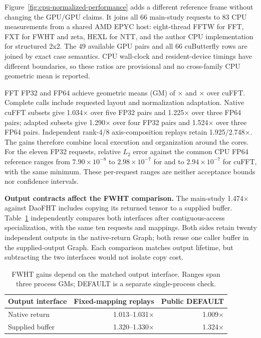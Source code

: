 Figure~\ref{fig:cpu-normalized-performance} adds a different reference frame
without changing the GPU/GPU claims. It joins all 66 main-study requests to 83
CPU measurements from a shared AMD EPYC host: eight-thread FFTW for FFT, FXT for
FWHT and zeta, HEXL for NTT, and the author CPU implementation for structured
2x2. The 49 available GPU pairs and all 66 cuButterfly rows are joined by exact
case semantics. CPU wall-clock and resident-device timings have different
boundaries, so these ratios are provisional and no cross-family CPU geometric
mean is reported.

\begin{table}[t]
\centering\small
\caption{Operator ratios retain their matched populations.
N/A/X counts native, adapted, and axis-composed baseline calls.}
\label{tab:current-operators}

\end{table}

FFT FP32 and FP64 achieve geometric means (GM) of
\CurrentFFTSingle$\times$ and \CurrentFFTDouble$\times$ over cuFFT.
Complete calls include requested layout and normalization adaptation. Native cuFFT subsets give 1.034$\times$ over five FP32 pairs
and 1.225$\times$ over three FP64 pairs; adapted subsets give
1.290$\times$ over four FP32 pairs and 1.524$\times$ over three FP64 pairs.
Independent rank-4/8 axis-composition replays retain 1.925/2.748$\times$.
The gains therefore combine local execution and organization around the cores.
For the eleven FP32 requests, relative $L_2$ error against the common CPU FP64
reference ranges from $7.90\times10^{-8}$ to $2.98\times10^{-7}$ for
\system{} and to $2.94\times10^{-7}$ for cuFFT, with the same minimum.
These per-request ranges are neither acceptance bounds nor confidence intervals.

\textbf{Output contracts affect the FWHT comparison.}
The main-study 1.474$\times$ against DaoFHT includes copying its returned
tensor to a supplied buffer. Table~\ref{tab:fwht-interfaces} independently compares
both interfaces after contiguous-access specialization, with the same ten
requests and mappings. Both sides retain twenty
independent outputs in the native-return Graph; both reuse one caller buffer
in the supplied-output Graph. Each comparison matches output lifetime, but
subtracting the two interfaces would not isolate copy cost.

\begin{table}[t]
\centering\small
\caption{FWHT gains depend on the matched output interface.
Ranges span three process GMs; DEFAULT is a separate single-process check.}
\label{tab:fwht-interfaces}
\begin{tabular}{@{}lrr@{}}
\toprule
Output interface & Fixed-mapping replays & Public DEFAULT\\\midrule
Native return & 1.013--1.031$\times$ & 1.009$\times$\\
Supplied buffer & 1.320--1.330$\times$ & 1.324$\times$\\
\bottomrule
\end{tabular}
\end{table}

